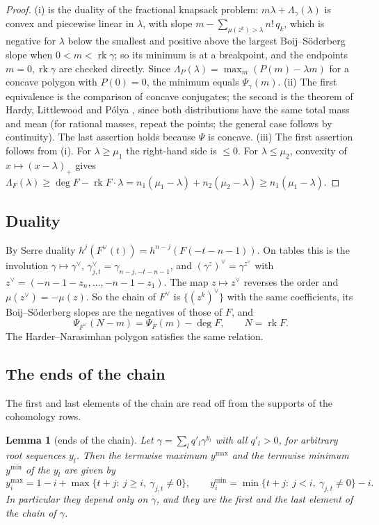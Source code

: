 \documentclass[11pt]{amsart}
\newtheorem{lemma}[theorem]{Lemma}
\theoremstyle{definition}
\theoremstyle{remark}
\DeclareMathOperator{\rk}{rk}
\begin{document}
\begin{proof}
(i) is the duality of the fractional knapsack problem: $m\lambda+\Lambda_\gamma(\lambda)$ is convex and piecewise linear in $\lambda$, with slope $m-\sum_{\mu(z^k)>\lambda}n!\,q_k$, which is negative for $\lambda$ below the smallest and positive above the largest Boij--Söderberg slope when $0<m<\rk\gamma$; so its minimum is at a breakpoint, and the endpoints $m=0,\rk\gamma$ are checked directly. Since $\Lambda_P(\lambda)=\max_m(P(m)-\lambda m)$ for a concave polygon with $P(0)=0$, the minimum equals $\Psi_\gamma(m)$. (ii) The first equivalence is the comparison of concave conjugates; the second is the theorem of Hardy, Littlewood and P\'olya \cite[Thm.~108]{HLP}, since both distributions have the same total mass and mean (for rational masses, repeat the points; the general case follows by continuity). The last assertion holds because $\Psi$ is concave. (iii) The first assertion follows from (i). For $\lambda\ge\mu_1$ the right-hand side is $\le0$. For $\lambda\le\mu_2$, convexity of $x\mapsto(x-\lambda)_+$ gives $\Lambda_F(\lambda)\ge\deg F-\rk F\cdot\lambda=n_1(\mu_1-\lambda)+n_2(\mu_2-\lambda)\ge n_1(\mu_1-\lambda)$.
\end{proof}

\subsection{Duality}
By Serre duality $h^j(F^\vee(t))=h^{n-j}(F(-t-n-1))$. On tables this is the involution $\gamma\mapsto\gamma^\vee$, $\gamma^\vee_{j,t}=\gamma_{n-j,-t-n-1}$, and $(\gamma^z)^\vee=\gamma^{z^\vee}$ with $z^\vee=(-n-1-z_n,\dots,-n-1-z_1)$. The map $z\mapsto z^\vee$ reverses the order and $\mu(z^\vee)=-\mu(z)$. So the chain of $F^\vee$ is $\{(z^k)^\vee\}$ with the same coefficients, its Boij--Söderberg slopes are the negatives of those of $F$, and
\begin{equation}\label{eq:dualpsi}
\Psi_{F^\vee}(N-m)=\Psi_F(m)-\deg F,\qquad N=\rk F .
\end{equation}
The Harder--Narasimhan polygon satisfies the same relation.

\subsection{The ends of the chain}
The first and last elements of the chain are read off from the supports of the cohomology rows.

\begin{lemma}[ends of the chain]\label{lem:ends}
Let $\gamma=\sum_lq'_l\gamma^{y_l}$ with all $q'_l>0$, for arbitrary root sequences $y_l$. Then the termwise maximum $y^{\max}$ and the termwise minimum $y^{\min}$ of the $y_l$ are given by
\[
y^{\max}_i=1-i+\max\{t+j:\ j\ge i,\ \gamma_{j,t}\ne0\},\qquad y^{\min}_i=\min\{t+j:\ j<i,\ \gamma_{j,t}\ne0\}-i .
\]
In particular they depend only on $\gamma$, and they are the first and the last element of the chain of $\gamma$.
\end{lemma}
\end{document}
